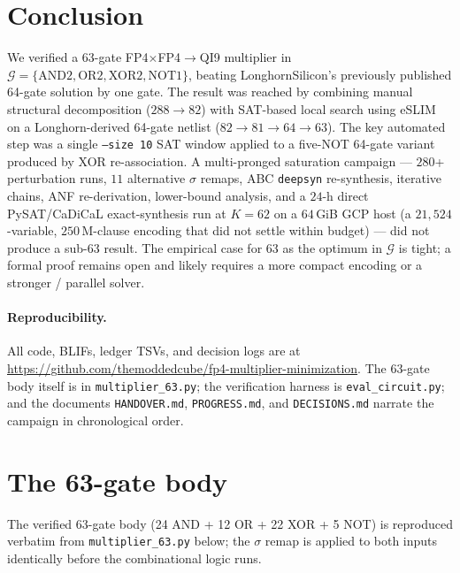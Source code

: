 \documentclass[11pt]{article}
\begin{document}
\section{Conclusion}

We verified a 63-gate FP4$\times$FP4$\to$QI9 multiplier in
$\mathcal{G} = \{\text{AND2}, \text{OR2}, \text{XOR2},
\text{NOT1}\}$, beating LonghornSilicon's previously published
64-gate solution by one gate.
The result was reached by combining manual structural decomposition
($288\to82$) with SAT-based local search using
eSLIM~\cite{reichl2024eslim} on a Longhorn-derived 64-gate netlist
($82\to81\to64\to63$). The key automated step was a single
\texttt{--size 10} SAT window applied to a five-NOT 64-gate variant
produced by XOR re-association.
A multi-pronged saturation campaign --- $280$+ perturbation runs,
$11$ alternative $\sigma$ remaps, ABC \texttt{deepsyn} re-synthesis,
iterative chains, ANF re-derivation, lower-bound analysis, and a
$24$-h direct PySAT/CaDiCaL exact-synthesis run at $K{=}62$ on a
$64$\,GiB GCP host (a $21{,}524$-variable, $250$\,M-clause encoding
that did not settle within budget) --- did not produce a sub-63
result. The empirical case for $63$ as the optimum in $\mathcal{G}$
is tight; a formal proof remains open and likely requires a more
compact encoding or a stronger / parallel solver.

\paragraph{Reproducibility.}
All code, BLIFs, ledger TSVs, and decision logs are at
\url{https://github.com/themoddedcube/fp4-multiplier-minimization}.
The 63-gate body itself is in \texttt{multiplier\_63.py};
the verification harness is \texttt{eval\_circuit.py}; and the
documents \texttt{HANDOVER.md}, \texttt{PROGRESS.md}, and
\texttt{DECISIONS.md} narrate the campaign in chronological order.

\appendix
\section{The 63-gate body}
\label{app:body}
The verified 63-gate body (24 AND + 12 OR + 22 XOR + 5 NOT)
is reproduced verbatim from \texttt{multiplier\_63.py} below; the
$\sigma$ remap is applied to both inputs identically before the
combinational logic runs.
\end{document}
